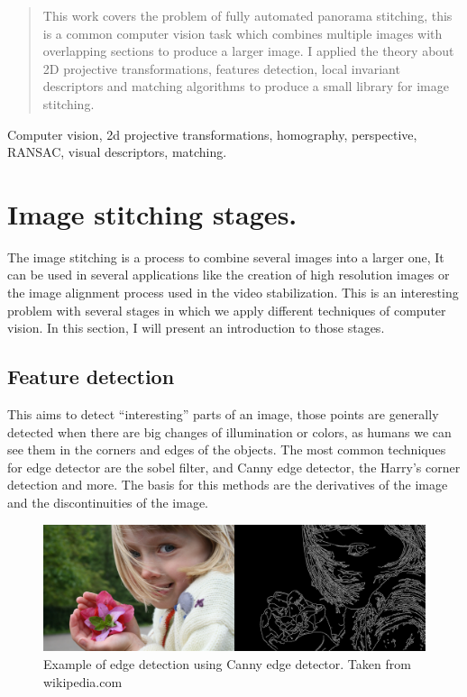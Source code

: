 \documentclass[journal]{IEEEtran}
\begin{document}
\begin{abstract}
This work covers the problem of fully automated panorama stitching, this is a
common computer vision task which combines multiple images with overlapping sections
to produce a larger image. I applied the theory about 2D projective transformations,
features detection, local invariant descriptors and matching algorithms to produce
a small library for image stitching.

\end{abstract}

\begin{IEEEkeywords}
Computer vision, 2d projective transformations, homography,
perspective, RANSAC, visual descriptors, matching.
\end{IEEEkeywords}

\section{Image stitching stages.}

The image stitching is a process to combine several images into a larger one,
It can be used in several applications like the creation of high resolution
images or the image alignment process used in the video stabilization. This is
an interesting problem with several stages in which we apply different
techniques of computer vision. In this section, I will present an introduction
to those stages.

\subsection{Feature detection}

This aims to detect ``interesting'' parts of an image, those points are
generally detected when there are big changes of illumination
or colors, as humans we can see them in the corners and edges of the objects.
The most common techniques for edge detector are the sobel filter,
and Canny edge detector, the Harry's corner detection and more. The basis for
this methods are the derivatives of the image and the discontinuities of
the image.

\begin{figure}[H]
\includegraphics[scale=0.16]{../img/edge_detection}
\caption{Example of edge detection using Canny edge detector. Taken from
wikipedia.com}
\label{canny}
\end{figure}
\end{document}

